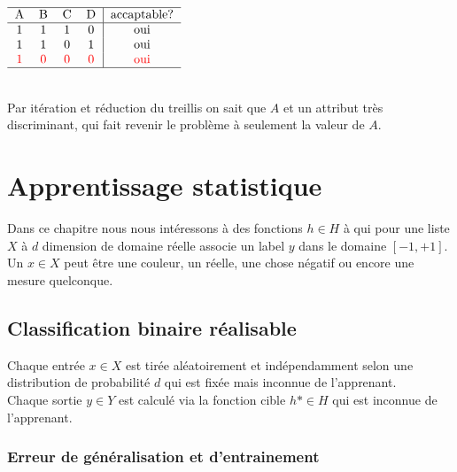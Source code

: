 \begin{multicols}{2}
[]
$\begin{tabular}{cccc|c}
\hline
A & B & C & D & accaptable? \\
\hline
1 & 1 & 1 & 0 & oui\\
1 & 1 & 0 & 1 & oui\\
\crouge{1} & \crouge{0} & \crouge{0} & \crouge{0} & \crouge{oui}\\
\hline
\end{tabular}$
\end{multicols}

\ \\
Par itération et réduction du treillis on sait que $A$ et un attribut très discriminant, qui fait revenir le problème à seulement la valeur de $A$.\\

\pagebreak
\chapter{Apprentissage statistique}

Dans ce chapitre nous nous intéressons à des fonctions $h \in H$ à qui pour une liste $X$ à $d$ dimension de domaine réelle associe un label $y$ dans le domaine $[-1,+1]$. Un $x \in X$ peut être une couleur, un réelle, une chose négatif ou encore une mesure quelconque.
\pagebreak

\section{Classification binaire réalisable}

Chaque entrée $x \in X$ est tirée aléatoirement et indépendamment selon une distribution de probabilité $d$ qui est fixée mais inconnue de l'apprenant.
\\
Chaque sortie $y \in Y$ est calculé via la fonction cible $h* \in H$ qui est inconnue de l'apprenant.

\subsection{Erreur de généralisation et d'entrainement}

